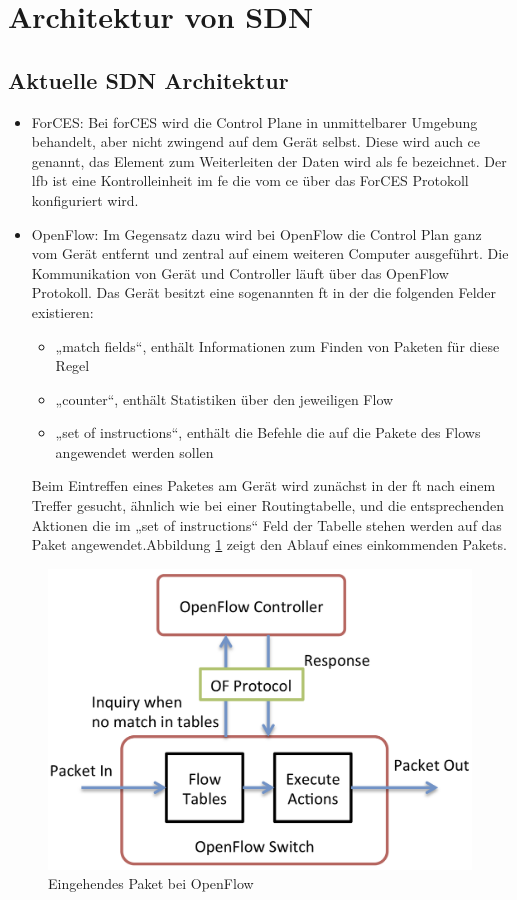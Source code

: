 \documentclass[twoside,12pt]{scrartcl}
\begin{document}
	\section{Architektur von SDN}
	\subsection{Aktuelle SDN Architektur}
		\begin{itemize}
			\item ForCES: Bei \gls{forCES} wird die Control Plane in unmittelbarer Umgebung behandelt, aber nicht zwingend auf dem Gerät selbst. Diese wird auch \gls{ce} genannt, das Element zum Weiterleiten der Daten wird als \gls{fe} bezeichnet. Der \gls{lfb} ist eine Kontrolleinheit im \gls{fe} die vom \gls{ce} über das ForCES Protokoll konfiguriert wird.
			\item OpenFlow: Im Gegensatz dazu wird bei OpenFlow die Control Plan ganz vom Gerät entfernt und zentral auf einem weiteren Computer ausgeführt. Die Kommunikation von Gerät und Controller läuft über das OpenFlow Protokoll. Das Gerät besitzt eine sogenannten \gls{ft} in der die folgenden Felder existieren: 
			\begin{itemize}
				\item „match fields“, enthält Informationen zum Finden von Paketen für diese Regel
				\item „counter“, enthält Statistiken über den jeweiligen Flow
				\item „set of instructions“, enthält die Befehle die auf die Pakete des Flows angewendet werden sollen
				\end{itemize}
Beim Eintreffen eines Paketes am Gerät wird zunächst in der \gls{ft} nach einem Treffer gesucht, ähnlich wie bei einer Routingtabelle, und die entsprechenden Aktionen die im „set of instructions“ Feld der Tabelle stehen werden auf das Paket angewendet.Abbildung \ref{fig:openflow-paket-incoming} zeigt den Ablauf eines einkommenden Pakets.
		\end{itemize}
		\begin{figure}
	\centering
	\includegraphics[width=0.95\linewidth]{openflow-paket-incoming}
	\caption{Eingehendes Paket bei OpenFlow}
	\label{fig:openflow-paket-incoming}
\end{figure}
\end{document}
